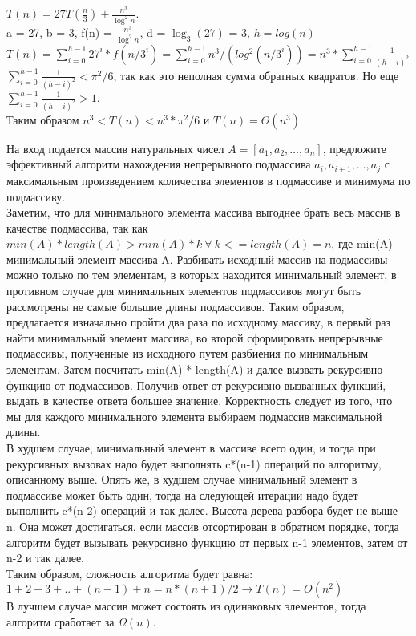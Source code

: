 \documentclass[12pt]{extreport}
\theoremstyle{definiton}
\theoremstyle{definition}
\theoremstyle{definition}
\newcounter{problem}
\newcounter{subproblem}
\def\PRSUBskip{
	\medskip
}
\def\prsubr{\PRSUBskip\noindent\stepcounter{subproblem}{\bf \asbuk{subproblem})}\;}
\def\prend{
	\medskip
}
\begin{document}
	\prsubr $T(n) = 27T(\frac{n}{3})+\frac{n^3}{\log^2 n} $.
	\newline
	\\a = 27, b = 3, f(n) = $\frac{n^3}{\log^2 n}$, d = $\log_3(27)$ = 3, $h = log(n)$
	\\ $T(n) = \sum\limits_{i=0}^{h-1} 27^i * f(n/3^i) = \sum\limits_{i=0}^{h-1} n^3 / (log^2(n/3^i)) = n^3 * \sum\limits_{i=0}^{h-1} \frac{1}{(h - i)^2}$
	\\ $\sum\limits_{i=0}^{h-1} \frac{1}{(h - i)^2} < \pi^2 / 6$, так как это неполная сумма обратных квадратов. Но еще $\sum\limits_{i=0}^{h-1} \frac{1}{(h - i)^2} > 1.$
	\\ Таким образом $n^3 < T(n) < n^3 * \pi^2 / 6$ и $T(n) = \Theta(n^3)$
	
	\prend

	\PR[7] На вход подается массив натуральных чисел $A=[a_1,a_2,\ldots,a_n]$, предложите эффективный алгоритм нахождения непрерывного подмассива $a_i, a_{i+1}, \dots, a_j$ с максимальным произведением количества элементов в подмассиве и минимума по подмассиву.
    \newline
    \\Заметим, что для минимального элемента массива выгоднее брать весь массив в качестве подмассива, так как $min(A)*length(A) > min(A) * k\ \forall\ k <= length(A)=n$, где min(A) - минимальный элемент массива A. Разбивать исходный массив на подмассивы можно только по тем элементам, в которых находится минимальный элемент, в противном случае для минимальных элементов подмассивов могут быть рассмотрены не самые большие длины подмассивов. Таким образом, предлагается изначально пройти два раза по исходному массиву, в первый раз найти минимальный элемент массива, во второй сформировать непрерывные подмассивы, полученные из исходного путем разбиения по минимальным элементам. Затем посчитать min(A) * length(A) и далее вызвать рекурсивно функцию от подмассивов. Получив ответ от рекурсивно вызванных функций, выдать в качестве ответа большее значение. Корректность следует из того, что мы для каждого минимального элемента выбираем подмассив максимальной длины.
    \\ В худшем случае, минимальный элемент в массиве всего один, и тогда при рекурсивных вызовах надо будет выполнять c*(n-1) операций по алгоритму, описанному выше. Опять же, в худшем случае минимальный элемент в подмассиве может быть один, тогда на следующей итерации надо будет выполнить c*(n-2) операций и так далее. Высота дерева разбора будет не выше n. Она может достигаться, если массив отсортирован в обратном порядке, тогда алгоритм будет вызывать рекурсивно функцию от первых n-1 элементов, затем от n-2 и так далее.
    \\ Таким образом, сложность алгоритма будет равна: $1+2+3+..+(n-1)+n=n*(n+1)/2 \to T(n) = O(n^2)$
    \\ В лучшем случае массив может состоять из одинаковых элементов, тогда алгоритм сработает за $\Omega(n)$.
\end{document}
